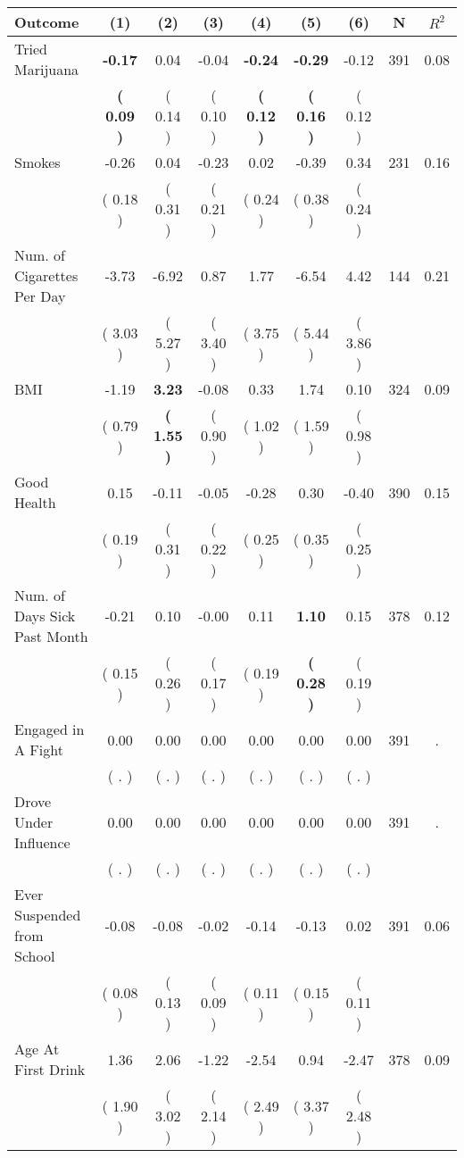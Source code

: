 \begin{tabular}{lcccccccc}
\toprule
 \textbf{Outcome} & \textbf{(1)} & \textbf{(2)} & \textbf{(3)} & \textbf{(4)} & \textbf{(5)} & \textbf{(6)} & \textbf{N} & \textbf{$ R^2$} \\
\midrule
Tried Marijuana & \textbf{    -0.17} &      0.04 &     -0.04 & \textbf{    -0.24} & \textbf{    -0.29} &     -0.12 & 391 &       0.08 \\ 
 & \textbf{(     0.09 )} & (     0.14 ) & (     0.10 ) & \textbf{(     0.12 )} & \textbf{(     0.16 )} & (     0.12 ) & \\
Smokes &     -0.26 &      0.04 &     -0.23 &      0.02 &     -0.39 &      0.34 & 231 &       0.16 \\ 
 & (     0.18 ) & (     0.31 ) & (     0.21 ) & (     0.24 ) & (     0.38 ) & (     0.24 ) & \\
Num. of Cigarettes Per Day &     -3.73 &     -6.92 &      0.87 &      1.77 &     -6.54 &      4.42 & 144 &       0.21 \\ 
 & (     3.03 ) & (     5.27 ) & (     3.40 ) & (     3.75 ) & (     5.44 ) & (     3.86 ) & \\
BMI &     -1.19 & \textbf{     3.23} &     -0.08 &      0.33 &      1.74 &      0.10 & 324 &       0.09 \\ 
 & (     0.79 ) & \textbf{(     1.55 )} & (     0.90 ) & (     1.02 ) & (     1.59 ) & (     0.98 ) & \\
Good Health &      0.15 &     -0.11 &     -0.05 &     -0.28 &      0.30 &     -0.40 & 390 &       0.15 \\ 
 & (     0.19 ) & (     0.31 ) & (     0.22 ) & (     0.25 ) & (     0.35 ) & (     0.25 ) & \\
Num. of Days Sick Past Month &     -0.21 &      0.10 &     -0.00 &      0.11 & \textbf{     1.10} &      0.15 & 378 &       0.12 \\ 
 & (     0.15 ) & (     0.26 ) & (     0.17 ) & (     0.19 ) & \textbf{(     0.28 )} & (     0.19 ) & \\
Engaged in A Fight &      0.00 &      0.00 &      0.00 &      0.00 &      0.00 &      0.00 & 391 &          . \\ 
 & (        . ) & (        . ) & (        . ) & (        . ) & (        . ) & (        . ) & \\
Drove Under Influence &      0.00 &      0.00 &      0.00 &      0.00 &      0.00 &      0.00 & 391 &          . \\ 
 & (        . ) & (        . ) & (        . ) & (        . ) & (        . ) & (        . ) & \\
Ever Suspended from School &     -0.08 &     -0.08 &     -0.02 &     -0.14 &     -0.13 &      0.02 & 391 &       0.06 \\ 
 & (     0.08 ) & (     0.13 ) & (     0.09 ) & (     0.11 ) & (     0.15 ) & (     0.11 ) & \\
Age At First Drink &      1.36 &      2.06 &     -1.22 &     -2.54 &      0.94 &     -2.47 & 378 &       0.09 \\ 
 & (     1.90 ) & (     3.02 ) & (     2.14 ) & (     2.49 ) & (     3.37 ) & (     2.48 ) & \\
\bottomrule
\end{tabular}
